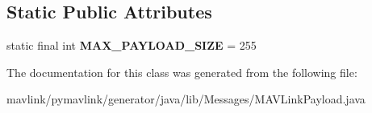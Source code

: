 \subsection*{Static Public Attributes}
\begin{DoxyCompactItemize}
\item 
\mbox{\label{classcom_1_1MAVLink_1_1Messages_1_1MAVLinkPayload_a878b05baa8a57e5cfc5177f84b668243}} 
static final int {\bfseries M\+A\+X\+\_\+\+P\+A\+Y\+L\+O\+A\+D\+\_\+\+S\+I\+ZE} = 255
\end{DoxyCompactItemize}


The documentation for this class was generated from the following file\+:\begin{DoxyCompactItemize}
\item 
mavlink/pymavlink/generator/java/lib/\+Messages/M\+A\+V\+Link\+Payload.\+java\end{DoxyCompactItemize}
